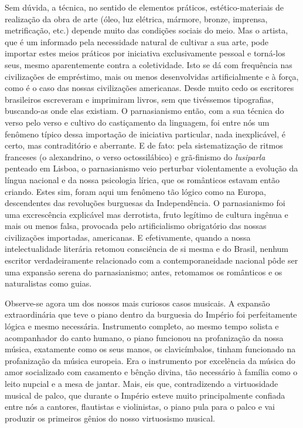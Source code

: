 Sem dúvida, a técnica, no sentido de elementos práticos,
estético-materiais de realização da obra de arte (óleo, luz elétrica,
mármore, bronze, imprensa, metrificação, etc.) depende muito das
condições sociais do meio. Mas o artista, que é um informado pela
necessidade natural de cultivar a sua arte, pode importar estes meios
práticos por iniciativa exclusivamente pessoal e torná-los seus, mesmo
aparentemente contra a coletividade. Isto se dá com frequência nas
civilizações de empréstimo, mais ou menos desenvolvidas artificialmente
e à força, como é o caso das nossas civilizações americanas. Desde muito
cedo os escritores brasileiros escreveram e imprimiram livros, sem que
tivéssemos tipografias, buscando-as onde elas existiam. O parnasianismo
então, com a sua técnica do verso pelo verso e cultivo do castiçamento
da linguagem, foi entre nós um fenômeno típico dessa importação de
iniciativa particular, nada inexplicável, é certo, mas contraditório e
aberrante. E de fato: pela sistematização de ritmos franceses (o
alexandrino, o verso octossilábico) e grã-finismo do \textit{lusiparla} penteado
em Lisboa, o parnasianismo veio perturbar violentamente a evolução da
língua nacional e da nossa psicologia lírica, que os românticos estavam
então criando. Estes sim, foram aqui um fenômeno tão lógico como na
Europa, descendentes das revoluções burguesas da Independência. O
parnasianismo foi uma excrescência explicável mas derrotista, fruto
legítimo de cultura ingênua e mais ou menos falsa, provocada pelo
artificialismo obrigatório das nossas civilizações importadas,
americanas. E efetivamente, quando a nossa intelectualidade literária
retomou consciência de si mesma e do Brasil, nenhum escritor
verdadeiramente relacionado com a contemporaneidade nacional pôde ser
uma expansão serena do parnasianismo; antes, retomamos os românticos e
os naturalistas como guias.

Observe-se agora um dos nossos mais curiosos casos musicais. A expansão
extraordinária que teve o piano dentro da burguesia do Império foi
perfeitamente lógica e mesmo necessária. Instrumento completo, ao mesmo
tempo solista e acompanhador do canto humano, o piano funcionou na
profanização da nossa música, exatamente como os seus manos, os
clavicímbalos, tinham funcionado na profanização da música europeia. Era
o instrumento por excelência da música do amor socializado com casamento
e bênção divina, tão necessário à família como o leito nupcial e a mesa
de jantar. Mais, eis que, contradizendo a virtuosidade musical de palco,
que durante o Império esteve muito principalmente confiada entre nós a
cantores, flautistas e violinistas, o piano pula para o palco e vai
produzir os primeiros gênios do nosso virtuosismo musical.


